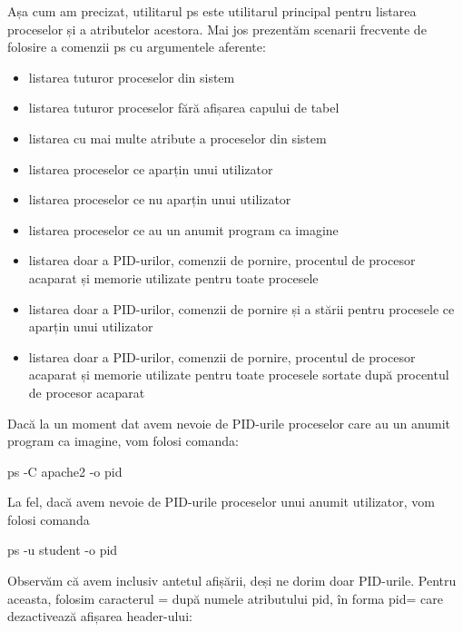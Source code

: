 Așa cum am precizat, utilitarul ps este utilitarul principal pentru listarea
proceselor și a atributelor acestora. Mai jos prezentăm scenarii frecvente de
folosire a comenzii ps cu argumentele aferente:

\begin{itemize}
	\item listarea tuturor proceselor din sistem
	\item listarea tuturor proceselor fără afișarea capului de tabel
	\item listarea cu mai multe atribute a proceselor din sistem
	\item listarea proceselor ce aparțin unui utilizator
	\item listarea proceselor ce nu aparțin unui utilizator
	\item listarea proceselor ce au un anumit program ca imagine
	\item listarea doar a PID-urilor, comenzii de pornire, procentul de
		procesor acaparat și memorie utilizate pentru toate procesele
	\item listarea doar a PID-urilor, comenzii de pornire și a stării pentru
		procesele ce aparțin unui utilizator
	\item listarea doar a PID-urilor, comenzii de pornire, procentul de
		procesor acaparat și memorie utilizate pentru toate procesele
		sortate după procentul de procesor acaparat
\end{itemize}

\begin{note}

Dacă la un moment dat avem nevoie de PID-urile proceselor
care au un anumit program ca imagine, vom folosi comanda:

\end{note}

\begin{screen}
ps -C apache2 -o pid
\end{screen}

La fel, dacă avem nevoie de PID-urile proceselor unui anumit utilizator, vom
folosi comanda

\begin{screen}
ps -u student -o pid
\end{screen}

Observăm că avem inclusiv antetul afișării, deși ne dorim doar PID-urile. Pentru
aceasta, folosim caracterul = după numele atributului pid, în forma pid= care
dezactivează afișarea header-ului:

